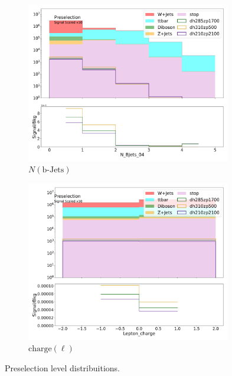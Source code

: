 \begin{figure}[htbp]
\begin{subfigure}{0.49\textwidth}
         \includegraphics[width = 0.98\textwidth]{Figures/appendix/Preselection/N_BJets_04.png}
         \caption{\ensuremath{N (\text{b-Jets})}\xspace}
         \end{subfigure}
         \begin{subfigure}{0.49\textwidth}
         \includegraphics[width = 0.98\textwidth]{Figures/appendix/Preselection/Lepton_charge.png}
         \caption{$\text{charge}(\ell)$}
         \end{subfigure}

         \caption{Preselection level distribuitions.}
         \label{fig:Presel3}
      \end{figure}
\FloatBarrier

